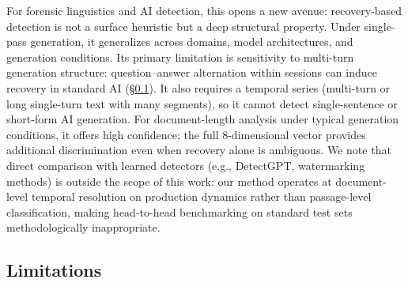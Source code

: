\documentclass[11pt]{article}
\begin{document}
For forensic linguistics and AI detection, this opens a new avenue: recovery-based detection is not a surface heuristic but a deep structural property. Under single-pass generation, it generalizes across domains, model architectures, and generation conditions. Its primary limitation is sensitivity to multi-turn generation structure: question--answer alternation within sessions can induce recovery in standard AI (\S\ref{sec:limitations}). It also requires a temporal series (multi-turn or long single-turn text with many segments), so it cannot detect single-sentence or short-form AI generation. For document-length analysis under typical generation conditions, it offers high confidence; the full 8-dimensional vector provides additional discrimination even when recovery alone is ambiguous. We note that direct comparison with learned detectors (e.g., DetectGPT, watermarking methods) is outside the scope of this work: our method operates at document-level temporal resolution on production dynamics rather than passage-level classification, making head-to-head benchmarking on standard test sets methodologically inappropriate.

\subsection{Limitations}
\label{sec:limitations}
\end{document}
